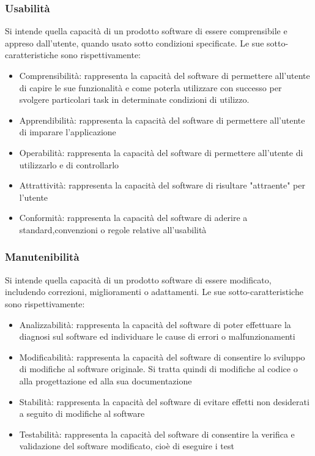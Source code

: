 \subsubsection{Usabilità}
Si intende quella capacità di un prodotto software di essere comprensibile e appreso dall'utente, quando usato sotto condizioni specificate.
Le sue sotto-caratteristiche sono rispettivamente:
\begin{itemize}
\item Comprensibilità: rappresenta la capacità del software di permettere all'utente di capire le sue funzionalità e come poterla utilizzare con successo per svolgere particolari task in determinate condizioni di utilizzo.
\item Apprendibilità: rappresenta la capacità del software di permettere all'utente di imparare l'applicazione
\item Operabilità: rappresenta la capacità del software di permettere all'utente di utilizzarlo e di controllarlo
\item Attrattività: rappresenta la capacità del software di risultare "attraente" per l'utente 
\item Conformità: rappresenta la capacità del software di aderire a standard,convenzioni o regole relative all'usabilità
\end{itemize}

\subsubsection{Manutenibilità}
Si intende quella capacità di un prodotto software di essere modificato, includendo correzioni, miglioramenti o adattamenti.
Le sue sotto-caratteristiche sono rispettivamente:
\begin{itemize}
\item Analizzabilità: rappresenta la capacità del software di poter effettuare la diagnosi sul software ed individuare le cause di errori o malfunzionamenti
\item Modificabilità: rappresenta la capacità del software di consentire lo sviluppo di modifiche al software originale. Si tratta quindi di modifiche al codice o alla progettazione ed alla sua documentazione
\item Stabilità: rappresenta la capacità del software di evitare effetti non desiderati a seguito di modifiche al software 
\item Testabilità: rappresenta la capacità del software di consentire la verifica e validazione del software modificato, cioè di eseguire i test
\end{itemize}

